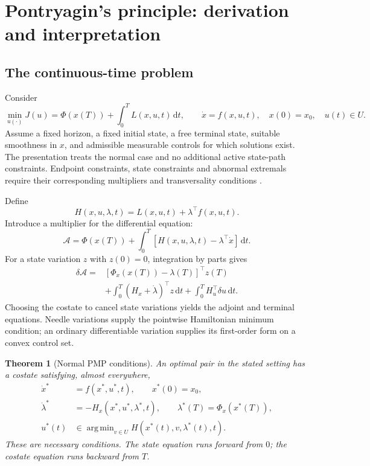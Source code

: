 \documentclass[11pt,a4paper]{article}
\newcommand{\dd}{\,\mathrm{d}}
\DeclareMathOperator*{\argmin}{arg\,min}
\newtheorem{theorem}[proposition]{Theorem}
\theoremstyle{definition}
\theoremstyle{remark}
\begin{document}
\section{Pontryagin's principle: derivation and interpretation}
\subsection{The continuous-time problem}
Consider
\begin{equation}
\min_{u(\cdot)}J(u)=\Phi(x(T))+\int_0^T L(x,u,t)\dd t,
\qquad \dot x=f(x,u,t),\quad x(0)=x_0,\quad u(t)\in U.
\label{eq:generic-control}
\end{equation}
Assume a fixed horizon, a fixed initial state, a free terminal state, suitable smoothness in $x$, and admissible measurable controls for which solutions exist. The presentation treats the normal case and no additional active state-path constraints. Endpoint constraints, state constraints and abnormal extremals require their corresponding multipliers and transversality conditions \cite{pontryagin,liberzon}.

Define
\begin{equation}
H(x,u,\lambda,t)=L(x,u,t)+\lambda^\top f(x,u,t).
\end{equation}
Introduce a multiplier for the differential equation:
\begin{equation}
\mathcal A=\Phi(x(T))+\int_0^T\left[H(x,u,\lambda,t)-\lambda^\top\dot x\right]\dd t.
\end{equation}
For a state variation $z$ with $z(0)=0$, integration by parts gives
\begin{align}
\delta\mathcal A
={}&[\Phi_x(x(T))-\lambda(T)]^\top z(T)\nonumber\\
&+\int_0^T(H_x+\dot\lambda)^\top z\dd t
+\int_0^T H_u^\top\delta u\dd t.
\label{eq:pmp-variation}
\end{align}
Choosing the costate to cancel state variations yields the adjoint and terminal equations. Needle variations supply the pointwise Hamiltonian minimum condition; an ordinary differentiable variation supplies its first-order form on a convex control set.

\begin{theorem}[Normal PMP conditions]
An optimal pair in the stated setting has a costate satisfying, almost everywhere,
\begin{align}
\dot x^*&=f(x^*,u^*,t),\qquad x^*(0)=x_0,\nonumber\\
\dot\lambda^*&=-H_x(x^*,u^*,\lambda^*,t),\qquad
\lambda^*(T)=\Phi_x(x^*(T)),\label{eq:pmp-system}\\
u^*(t)&\in\argmin_{v\in U}H(x^*(t),v,\lambda^*(t),t).\nonumber
\end{align}
These are necessary conditions. The state equation runs forward from $0$; the costate equation runs backward from $T$.
\end{theorem}
\end{document}
